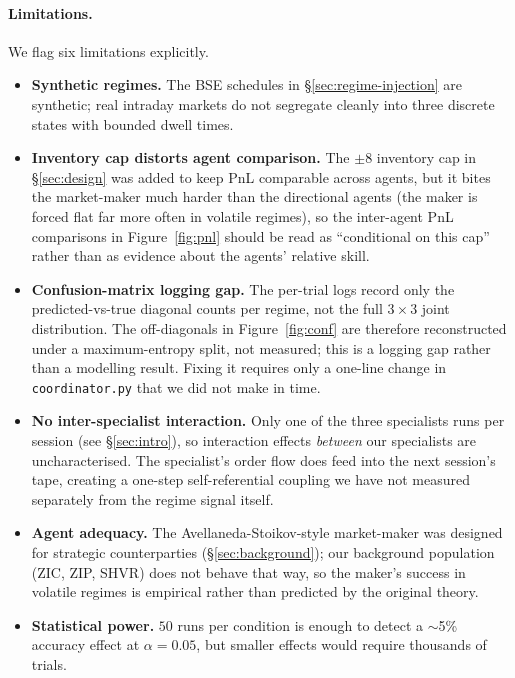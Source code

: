 \documentclass[11pt,a4paper]{article}
\begin{document}
\paragraph{Limitations.}
We flag six limitations explicitly.
\begin{itemize}[leftmargin=0.7cm,itemsep=0.15ex]
    \item \textbf{Synthetic regimes.} The BSE schedules in
    \S\ref{sec:regime-injection} are synthetic; real intraday markets do not
    segregate cleanly into three discrete states with bounded dwell times.
    \item \textbf{Inventory cap distorts agent comparison.} The $\pm$8
    inventory cap in \S\ref{sec:design} was added to keep PnL comparable
    across agents, but it bites the market-maker much harder than the
    directional agents (the maker is forced flat far more often in volatile
    regimes), so the inter-agent PnL comparisons in
    Figure~\ref{fig:pnl} should be read as ``conditional on this cap'' rather
    than as evidence about the agents' relative skill.
    \item \textbf{Confusion-matrix logging gap.} The per-trial logs record
    only the predicted-vs-true diagonal counts per regime, not the full
    $3\times 3$ joint distribution. The off-diagonals in
    Figure~\ref{fig:conf} are therefore reconstructed under a
    maximum-entropy split, not measured; this is a logging gap rather than
    a modelling result. Fixing it requires only a one-line change in
    \texttt{coordinator.py} that we did not make in time.
    \item \textbf{No inter-specialist interaction.} Only one of the three
    specialists runs per session (see \S\ref{sec:intro}), so interaction
    effects \emph{between} our specialists are uncharacterised. The
    specialist's order flow does feed into the next session's tape,
    creating a one-step self-referential coupling we have not measured
    separately from the regime signal itself.
    \item \textbf{Agent adequacy.} The Avellaneda-Stoikov-style market-maker
    was designed for strategic counterparties (\S\ref{sec:background}); our
    background population (ZIC, ZIP, SHVR) does not behave that way, so the
    maker's success in volatile regimes is empirical rather than predicted
    by the original theory.
    \item \textbf{Statistical power.} $50$ runs per condition is enough to
    detect a $\sim$5\% accuracy effect at $\alpha=0.05$, but smaller effects
    would require thousands of trials.
\end{itemize}
\end{document}
